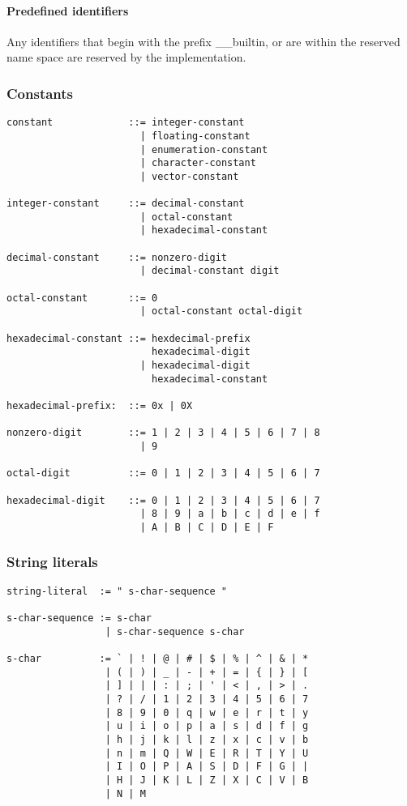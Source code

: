 \documentclass{article}
\begin{document}
\paragraph*{Predefined identifiers}
Any identifiers that begin with the prefix \_\_builtin, or are within the reserved name
space are reserved by the implementation.

\subsubsection{Constants}
\begin{lstlisting}[language=bnf]
constant             ::= integer-constant
                       | floating-constant
                       | enumeration-constant
                       | character-constant
                       | vector-constant
           
integer-constant     ::= decimal-constant
                       | octal-constant
                       | hexadecimal-constant
                   
decimal-constant     ::= nonzero-digit
                       | decimal-constant digit
                   
octal-constant       ::= 0
                       | octal-constant octal-digit
                   
hexadecimal-constant ::= hexdecimal-prefix
                         hexadecimal-digit
                       | hexadecimal-digit
                         hexadecimal-constant

hexadecimal-prefix:  ::= 0x | 0X

nonzero-digit        ::= 1 | 2 | 3 | 4 | 5 | 6 | 7 | 8
                       | 9
                       
octal-digit          ::= 0 | 1 | 2 | 3 | 4 | 5 | 6 | 7

hexadecimal-digit    ::= 0 | 1 | 2 | 3 | 4 | 5 | 6 | 7
                       | 8 | 9 | a | b | c | d | e | f
                       | A | B | C | D | E | F
\end{lstlisting}

\subsubsection{String literals}
\begin{lstlisting}[language=bnf]
string-literal  := " s-char-sequence "

s-char-sequence := s-char
                 | s-char-sequence s-char
                 
s-char          := ` | ! | @ | # | $ | % | ^ | & | *
                 | ( | ) | _ | - | + | = | { | } | [
                 | ] | | | : | ; | ' | < | , | > | .
                 | ? | / | 1 | 2 | 3 | 4 | 5 | 6 | 7
                 | 8 | 9 | 0 | q | w | e | r | t | y
                 | u | i | o | p | a | s | d | f | g
                 | h | j | k | l | z | x | c | v | b 
                 | n | m | Q | W | E | R | T | Y | U
                 | I | O | P | A | S | D | F | G | |
                 | H | J | K | L | Z | X | C | V | B
                 | N | M
\end{lstlisting}
\end{document}
